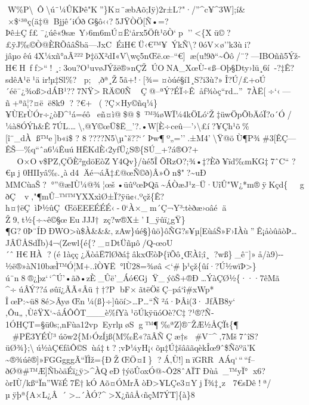 W\%P\textbackslash~Ô\textbackslash ú¨¼ÛKÞê"K''\}K¤¨æbAõ;Iÿ)2r±L?"·/''\^{}c¥\^{}3W{]};í\&

×\$`³ªç(ä‡@Bjjê´iÓðG§ô‹‹?5JŸÒÖ­{[}Ñ •=?Þê±Çƒ£¯¿úê«9sæ~Y›6m6mÚ¤Ë`årx5Öƒt¹õÒ`p''\textless\{Xü©?£ÿJ‰©Ò@ÈRÕââŠbä---JxCÉiH€Ü‹€™¥~ÝkÑ\textbackslash?\textquotesingle0óV×ø''k3ùi?jâµoêú4X¼xñ°aÃ²²²Þ‡öX²dI«V­\textbackslash wç5nŒë.œ--``€{]}æ(u !9ð``\textasciitilde Ôô/¨?---IBOññ5Ýž-H€H~ff\textgreater``!
¸:3ou?O¹uvøJÝžë®»nÇŽÚONA \_XœÙ-«ß--Oþ§Dt\textbar y›lü¸6í-?‡Ê?sdêA¹ë¹ä
ir!µ‡Sl\%?
p;,ðª¸Ž5ã+!·{[}¾=¤ò\textbar úé§í1¸S?i3ù?»Î?Ú/£+oÚ´éë¯¿¾oß\textgreater dÁB¹??7NŸ\textgreaterRÄ©0Ñ
Ç@--ªÝ?ÉÏ÷Êåƒ¾òç``rd\ldots''7ÀË{[}÷`‹---ñ+ªã¦?¤ë­ë8k9 ? 
?€+(?\textquotesingle Ç×Hy©ñq¼\}¥ÙErÙÓr÷¿òÐ\^{}¹á=éôeñ¤ì@\$@\$~™ ¾øWÏ¼4kÖLó`Ž ‡üwÖpÕbÄóÏ?o´Ó/¼à8ÓÝh\&Ê7ÚL.\ldots\textbackslash‚@Y©œÜ\$Ë\_'?.•W{[}È÷ceû---'›\textbackslash£í?¥Çh¹õ\%{[}î¨\_dÀß™e{]}b«i\$
? 
8????N5\textbackslash µ˜š??{}`´Þw¶º„=''.±M4'\textbackslash Ÿ@öÙ¶P¾\#3{[}ÊÇ---ÊŠ---\%q``ˆa6¼ÊuúHËKdÈ‹2yƒÜ¿S®\{SÚ\_+?á®O?+

O ×Ov\$PZ,ÇÖÈ²gdöEòZY4Qv\}/ùé5ÎÕRzO?;¾•‡?Èð¥ïd‰mKG‡7ˆC`` 
?€µj 0HIIyâ‰\textquotesingle.¸àd4Äé¬áÃ‡£@œÑ©ð)Â»Õn\$"?\textasciitilde uÐ
MMCùaŠ?\textquotesingle°''@æIÙ¼@¾¦œ­š•üûºœÞQã\textasciitilde ÁÒæJ¹z--Ü·UîÛ"W¿*m®ÿKçd\{
g
ðÇ~v‚"¶mÛ--™™YXXxìØ±Ï?ÿü¢‹.ºçž\{Ê?h¤†ëÇìÞ½ûÇŒöEEEÉÉÉ‹-0`À×\_m´Ç¬Y³:tèðæ›oâéä
Ž9‚t½\{÷\textasciitilde ê©§œEuJJJ†zç?w®X±'I\_ÿûï¿gŸ\}¶G?0Þ¨ÍÐÐWO\textgreater ù\$À\&\&\&‚zAw\}úé§\}ûö\}ôÑG?s¥µ{[}EùáŠ»F›IÀù''Ê¡åòûãòÞ\ldots JÂÜÅSdÏb)4¬(Zewl\{é\{?\_¤DtÜñµô/Q-œoU´ˆH€HÀ?(é1àçç¿ÄòåË7lØðá‡âkxŒòÞ\{ïÕô¸ŒÀî;î¸?wß\}\_ê¯{]}»å/à9)-\/-½ë®»àN10bæÌ™Ó¦M+..îÒ¥Ë\textbar°lÙ28=¾øâ\textless`\#þ¹çž\{ûí·?Ú½wïÞ\textgreater\}ú¨n8®¿þz`\,`\^{}Ú'•ãð•zÈ\_Ûë'\_Áó€GjŸ\_ýõŠ+®Ð­\ldots ÝàÇØ½\{···7êMã
\^{}÷úÂÝ??áøûï¿ÃÃ«Âü \textquotesingle††?P bF×ãtëÖšÇ--pá\textbar`î\#xWp*
ÎœP:\textasciitilde ü88é\textgreater Ây\textquotesingle øŒn¼(ß\}÷{]}ûöí\textgreater\ldots*P\ldots``Ñ²á­·ÞÂi(3·J fÃB8y`
,Ôu„‚ÙêŸX`\textasciitilde åÁÔÔT\_\_\_è\%ƒYà¹öÚkÿüóOè?C‡?¹®?Ñ­1ÓHÇT=§ü0s;,nFùa12vpEyrlµøSg™¶‰ªZ{]}®¨ŽÆ½ÅÇÏt\{¶
\textquotesingle\#PË3YÉÙ³úõw2\{M›ÓzÍjß(M‰Ë«?ãÂÑÇæ†s 
\#V¯\^{}‚7\textquotesingle Mš7ˆîS?üØ¾\};\textbackslashú½àÇ€ƒâÔ©Sùá‡t?;vÞ¼yH¡‹õµ‡Ú ‡šâããqèkÎœ9ˆ\$Ñõºä'K
\textasciitilde®¾úê®{]}»FGGgggÃ`` ÏÌž=\{ÐŽŒÖ¤I\}
?Á‚Ù!{]}nïGRRAÁq`\,``\,``ƒ--ðØ@\#™Æ{]}ÑbòäÉï¿ÿ\textgreater\^{}ÀQ­eÐ†ýöÛoxÓ@\textasciitilde Ô28ˆAÏTÐùå\_™yÏ°
x6?òrIÙ/kß``Ïn''WšÉ7Ë†kÓAõ¤ÓMrÃòÐ\textgreater¥LÇe3¤YjÏ¾‡¸z
7\textquotesingle€sDê
!ª/µÿþª\{A×L¿Â´\textgreater\ldots´ÀÓ?\^{}\textgreater\textbar X¿ñâÅ‹ñçM7ÝT{]}\{à\}8
